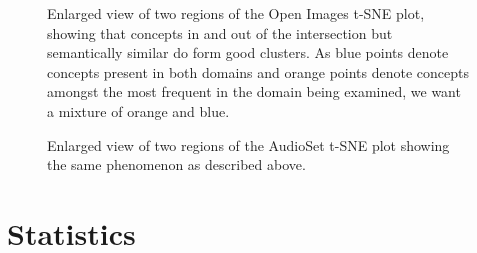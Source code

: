 \begin{figure}[H]
\label{fig:openimageszoom}
    \centering
    \caption{Enlarged view of two regions of the Open Images t-SNE plot, showing that concepts in and out of the intersection but semantically similar do form good clusters. As blue points denote concepts present in both domains and orange points denote concepts amongst the most frequent in the domain being examined, we want a mixture of orange and blue. }
\end{figure}

\begin{figure}[H]
\label{fig:audiosetzoom}
    \centering
    \caption{Enlarged view of two regions of the AudioSet t-SNE plot showing the same phenomenon as described above.}
\end{figure}


\section{Statistics}

